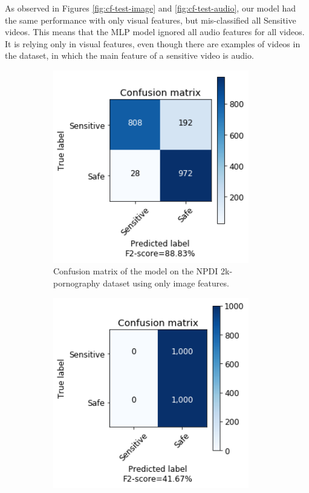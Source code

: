 As observed in Figures \ref{fig:cf-test-image} and \ref{fig:cf-test-audio}, our model had the same performance with only visual features, but mis-classified all Sensitive videos. This means that the MLP model ignored all audio features for all videos. It is relying only in visual features, even though there are examples of videos in the dataset, in which the main feature of a sensitive video is audio. %

\begin{figure}[!ht]
    \centering
    \begin{subfigure}[b]{0.49\textwidth}
        \includegraphics[width=0.94\textwidth]{img/results/MLP-2K-TEST-IMAGE-ONLY.png}
        \caption{Confusion matrix of the model on the NPDI 2k-pornography dataset using only image features.}
        \label{fig:cf-test-2k-image}
    \end{subfigure}
    \begin{subfigure}[b]{0.49\textwidth}
        \includegraphics[width=0.94\textwidth]{img/results/MLP-2K-TEST-AUDIO-ONLY.png}

\end{subfigure}
\end{figure}
